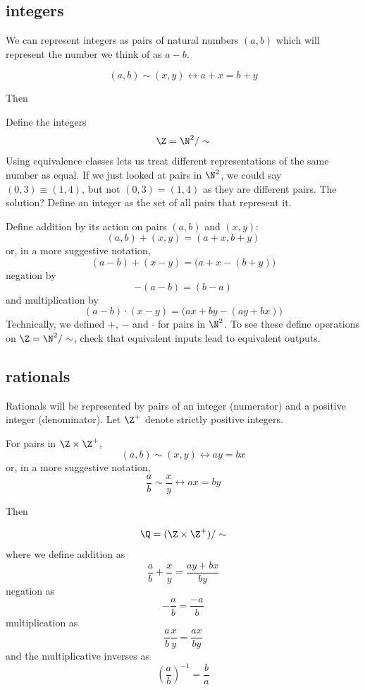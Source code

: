 \documentclass{scrbook}
\renewcommand{\iff}{\leftrightarrow}
\begin{document}
\subsection[Integers]{integers}
We can represent integers as pairs of natural numbers $(a,b)$ which will represent the number we think of as $a-b$. 
\begin{defn}[\sim]
  \[
  (a,b)\sim(x,y) \iff a+x=b+y
  \]
\end{defn}
Then 
\begin{defn}[$\Z$]
  Define the integers
  \[
  \Z=\N^2/\sim
  \]
  Using equivalence classes lets us treat different representations of the same number as equal. If we just looked at pairs in $\N^2$, we could say $(0,3)\equiv (1,4)$, but not $(0,3)=(1,4)$ as they are different pairs. The solution? Define an integer as the set of all pairs that represent it. 

  Define addition by its action on pairs $(a,b)$ and $(x,y)$:
  \[
  (a,b)+(x,y)=(a+x,b+y)
  \]
  or, in a more suggestive notation, 
  \[
  (a-b)+(x-y)=\bigl(a+x-(b+y)\bigr)
  \]
  negation by
  \[
  -(a-b)=(b-a)
  \]
  and multiplication by
  \[
  (a - b)\cdot(x-y)=\bigl(ax +by - (ay+bx)\bigr)
  \]
  Technically, we defined $+$, $-$ and $\cdot$ for pairs in $\N^2$. To see these define operations on $\Z=\N^2/\sim$, check that equivalent inputs lead to equivalent outputs. 
\end{defn}
\subsection[Rationals]{rationals}
Rationals will be represented by pairs of an integer (numerator) and a positive integer (denominator). Let $\Z^+$ denote strictly positive integers. 
\begin{defn}[\sim]
  For pairs in $\Z\times \Z^+$,
  \[
  (a,b)\sim(x,y) \iff ay=bx
  \]
  or, in a more suggestive notation, 
  \[
  \frac a b \sim \frac x y \iff ax = by
  \]
\end{defn}
Then
\begin{defn}[$\Q$]
  \[
  \Q=(\Z\times\Z^+)/\sim
  \]
  where we define addition as
  \[
  \frac ab + \frac xy = \frac{ay+bx}{by}
  \]
  negation as
  \[
  -\frac ab = \frac{-a}b
  \]
  multiplication as
  \[
  \frac ab \frac xy = \frac {ax}{by}
  \]
  and the multiplicative inverses as
  \[
  \left(\frac ab\right)^{-1} = \frac ba
  \]
\end{defn}
\end{document}

